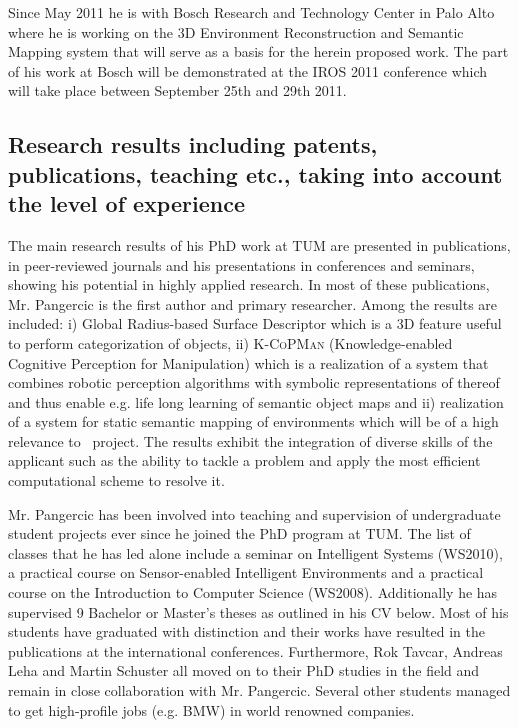 Since May 2011 he is with Bosch Research and Technology Center in Palo Alto where he is working 
on the 3D Environment Reconstruction and Semantic Mapping system that will serve as a basis for
the herein proposed work. The part of his work at Bosch will be demonstrated at the IROS 2011
conference which will take place between September 25th and 29th 2011.
\subsection{Research results including patents, publications, teaching etc., taking into account the level 
of experience} 
The main research results of his PhD work at TUM are presented in publications, in
peer-reviewed journals and his presentations in conferences and seminars, showing his 
potential in highly applied research. In most of these publications, Mr. Pangercic is the  first 
author and primary researcher. Among the results are included: i) Global Radius-based Surface
Descriptor which is a 3D feature useful to perform categorization of objects, ii) \textsc{K-CoPMan}
(Knowledge-enabled Cognitive Perception for Manipulation) which is a realization of a system that 
combines robotic perception algorithms with symbolic representations of thereof and thus enable
e.g. life long learning of semantic object maps and ii) realization of
a system for static semantic mapping of environments which will be of a high relevance to \ksem\ project.
The results exhibit the integration of diverse skills of the applicant such as the ability  to tackle 
a problem and apply the most efficient computational scheme to resolve it.

Mr. Pangercic has been involved into teaching and supervision of undergraduate 
student projects ever since he joined the PhD program at TUM. The list of classes 
that he has led alone include a seminar on Intelligent Systems (WS2010), a practical 
course on Sensor-enabled Intelligent Environments and a practical course on the 
Introduction to Computer Science (WS2008). Additionally he has supervised 9 Bachelor
or Master's theses as outlined in his CV below. Most of his students have graduated
with distinction and their works have resulted in the publications at the international
conferences. Furthermore, Rok Tavcar, Andreas Leha and Martin Schuster all moved on 
to their PhD studies in the field and remain in close collaboration with Mr. Pangercic.
Several other students managed to get high-profile jobs (e.g. BMW) in world renowned 
companies. 

